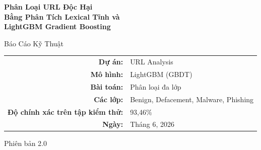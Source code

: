 \documentclass[a4paper,12pt]{article}
\begin{document}
\begin{titlepage}
\centering
\vspace*{2cm}

{\Huge\bfseries Phân Loại URL Độc Hại\\[0.4cm]
Bằng Phân Tích Lexical Tĩnh và\\[0.4cm]
LightGBM Gradient Boosting}

\vspace{1.5cm}

{\Large Báo Cáo Kỹ Thuật}

\vspace{2cm}

{\large
\begin{tabular}{rl}
\textbf{Dự án:}       & URL Analysis \\
\textbf{Mô hình:}     & LightGBM (GBDT) \\
\textbf{Bài toán:}    & Phân loại đa lớp \\
\textbf{Các lớp:}     & Benign, Defacement, Malware, Phishing \\
\textbf{Độ chính xác trên tập kiểm thử:} & 93,46\% \\
\textbf{Ngày:}        & Tháng 6, 2026 \\
\end{tabular}
}

\vspace{3cm}
\vfill
{\small Phiên bản 2.0}
\end{titlepage}

\begin{abstract}
Báo cáo này trình bày một hệ thống phân loại URL độc hại toàn diện, dựa hoàn toàn vào phân tích lexical tĩnh (static lexical analysis) trên chuỗi ký tự URL (Uniform Resource Locator). Hệ thống đề xuất trích xuất 63 đặc trưng số được thiết kế thủ công từ văn bản URL thô --- bao gồm các chỉ số cấu trúc, thống kê, lexical và đặc thù mối đe dọa mạng --- mà không cần thực hiện bất kỳ yêu cầu mạng, truy vấn DNS hay truy xuất nội dung trang web nào. Mô hình phân loại LightGBM Gradient Boosted Decision Tree (GBDT) được huấn luyện trên tập dữ liệu gồm 661.976 URL được tổng hợp từ tập dữ liệu Malicious Phish trên Kaggle và nguồn cấp malware URLhaus. Để giảm thiểu rò rỉ dữ liệu ở cấp domain, phương pháp Stratified Group $K$-Fold cross-validation được áp dụng, đảm bảo không có sự trùng lặp domain giữa các tập huấn luyện, kiểm định và kiểm tra. Mô hình đạt được độ chính xác trên tập test là \textbf{93,46\%} trên bốn loại mối đe dọa --- \textit{benign} (lành tính), \textit{defacement} (phá hoại giao diện), \textit{malware} (phần mềm độc hại) và \textit{phishing} (lừa đảo) --- đồng thời duy trì độ trễ suy luận dưới mili-giây cho mỗi URL. Báo cáo này trình bày chi tiết toàn bộ quy trình xử lý, phương pháp kỹ thuật đặc trưng, quy trình huấn luyện mô hình, kiến trúc suy luận, cũng như phân tích hạn chế và đề xuất kiến trúc nâng cấp trong tương lai.
\end{abstract}
\end{document}
